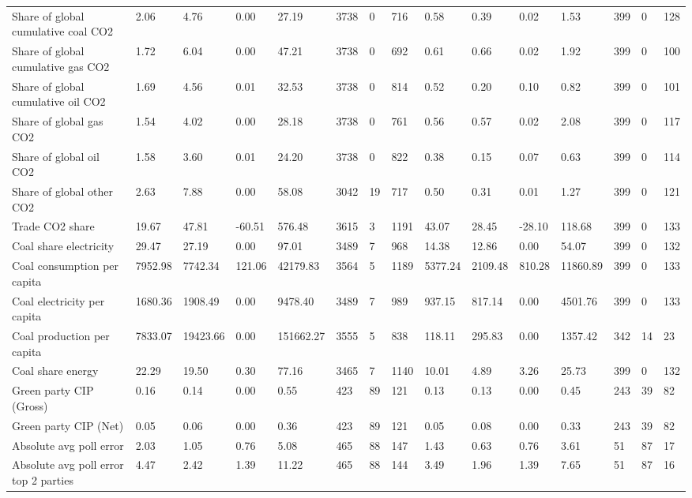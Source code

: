 \begin{longtable}{lllllllllllllll}
Share of global cumulative coal CO2 & 2.06 & 4.76 & 0.00 & 27.19 & 3738 & 0 & 716 & 0.58 & 0.39 & 0.02 & 1.53 & 399 & 0 & 128\\
Share of global cumulative gas CO2 & 1.72 & 6.04 & 0.00 & 47.21 & 3738 & 0 & 692 & 0.61 & 0.66 & 0.02 & 1.92 & 399 & 0 & 100\\
Share of global cumulative oil CO2 & 1.69 & 4.56 & 0.01 & 32.53 & 3738 & 0 & 814 & 0.52 & 0.20 & 0.10 & 0.82 & 399 & 0 & 101\\
\addlinespace
Share of global gas CO2 & 1.54 & 4.02 & 0.00 & 28.18 & 3738 & 0 & 761 & 0.56 & 0.57 & 0.02 & 2.08 & 399 & 0 & 117\\
Share of global oil CO2 & 1.58 & 3.60 & 0.01 & 24.20 & 3738 & 0 & 822 & 0.38 & 0.15 & 0.07 & 0.63 & 399 & 0 & 114\\
Share of global other CO2 & 2.63 & 7.88 & 0.00 & 58.08 & 3042 & 19 & 717 & 0.50 & 0.31 & 0.01 & 1.27 & 399 & 0 & 121\\
Trade CO2 share & 19.67 & 47.81 & -60.51 & 576.48 & 3615 & 3 & 1191 & 43.07 & 28.45 & -28.10 & 118.68 & 399 & 0 & 133\\
Coal share electricity & 29.47 & 27.19 & 0.00 & 97.01 & 3489 & 7 & 968 & 14.38 & 12.86 & 0.00 & 54.07 & 399 & 0 & 132\\
\addlinespace
Coal consumption per capita & 7952.98 & 7742.34 & 121.06 & 42179.83 & 3564 & 5 & 1189 & 5377.24 & 2109.48 & 810.28 & 11860.89 & 399 & 0 & 133\\
Coal electricity per capita & 1680.36 & 1908.49 & 0.00 & 9478.40 & 3489 & 7 & 989 & 937.15 & 817.14 & 0.00 & 4501.76 & 399 & 0 & 133\\
Coal production per capita & 7833.07 & 19423.66 & 0.00 & 151662.27 & 3555 & 5 & 838 & 118.11 & 295.83 & 0.00 & 1357.42 & 342 & 14 & 23\\
Coal share energy & 22.29 & 19.50 & 0.30 & 77.16 & 3465 & 7 & 1140 & 10.01 & 4.89 & 3.26 & 25.73 & 399 & 0 & 132\\
Green party CIP (Gross) & 0.16 & 0.14 & 0.00 & 0.55 & 423 & 89 & 121 & 0.13 & 0.13 & 0.00 & 0.45 & 243 & 39 & 82\\
\addlinespace
Green party CIP (Net) & 0.05 & 0.06 & 0.00 & 0.36 & 423 & 89 & 121 & 0.05 & 0.08 & 0.00 & 0.33 & 243 & 39 & 82\\
Absolute avg poll error & 2.03 & 1.05 & 0.76 & 5.08 & 465 & 88 & 147 & 1.43 & 0.63 & 0.76 & 3.61 & 51 & 87 & 17\\
Absolute avg poll error top 2 parties & 4.47 & 2.42 & 1.39 & 11.22 & 465 & 88 & 144 & 3.49 & 1.96 & 1.39 & 7.65 & 51 & 87 & 16\\

\end{longtable}
